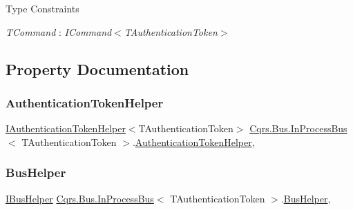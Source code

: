 \begin{Desc}
\item[Type Constraints]\begin{description}
\item[{\em T\+Command} : {\em I\+Command$<$T\+Authentication\+Token$>$}]\end{description}
\end{Desc}


\subsection{Property Documentation}
\mbox{\label{classCqrs_1_1Bus_1_1InProcessBus_a20d068b944183ab04e77c3164d19a860}} 
\subsubsection{\texorpdfstring{Authentication\+Token\+Helper}{AuthenticationTokenHelper}}
{\footnotesize\ttfamily \hyperlink{interfaceCqrs_1_1Authentication_1_1IAuthenticationTokenHelper}{I\+Authentication\+Token\+Helper}$<$T\+Authentication\+Token$>$ \hyperlink{classCqrs_1_1Bus_1_1InProcessBus}{Cqrs.\+Bus.\+In\+Process\+Bus}$<$ T\+Authentication\+Token $>$.\hyperlink{classCqrs_1_1Authentication_1_1AuthenticationTokenHelper}{Authentication\+Token\+Helper}\hspace{0.3cm}{\ttfamily [get]}, {\ttfamily [protected]}}

\mbox{\label{classCqrs_1_1Bus_1_1InProcessBus_a5dd1cb40277f3e04e743dd8cd63523ff}} 
\subsubsection{\texorpdfstring{Bus\+Helper}{BusHelper}}
{\footnotesize\ttfamily \hyperlink{interfaceCqrs_1_1Bus_1_1IBusHelper}{I\+Bus\+Helper} \hyperlink{classCqrs_1_1Bus_1_1InProcessBus}{Cqrs.\+Bus.\+In\+Process\+Bus}$<$ T\+Authentication\+Token $>$.\hyperlink{classCqrs_1_1Bus_1_1BusHelper}{Bus\+Helper}\hspace{0.3cm}{\ttfamily [get]}, {\ttfamily [protected]}}

